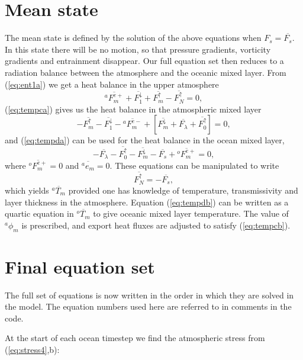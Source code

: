 \documentclass[11pt, a4paper,twoside]{article}
\newcommand{\e}[2]{{{}^{#1}e_{#2}}}
\newcommand{\T}[2]{{{}^{#1}T_{#2}}}
\newcommand{\F}[3]{{{}^{#1}F^{#3}_{#2}}}
\newcommand{\Fup}[1]{{F^{\uparrow}_{#1}}}
\newcommand{\Fdown}[1]{{F^{\downarrow}_{#1}}}
\newcommand{\lb}[2]{{{}^{#1}\phi_{#2}}}
\numberwithin{equation}{section}
\begin{document}
\section{Mean state}\label{sec:mean}
The mean state is defined by the solution of the above equations when $F_s = \overline{F_s}$.
In this state there will be no motion, so that pressure gradients, vorticity gradients and entrainment disappear.
Our full equation set then reduces to a radiation balance between the atmosphere and the oceanic mixed layer.
From (\ref{eq:ent1a}) we get a heat balance in the upper atmosphere
\begin{equation}\label{eq:ent1b}
\overline{\F{a}{m}{e+}} + \overline{\Fdown{1}} + \overline{\Fup{m}} - \overline{\Fup{N}}=0,
\end{equation}
(\ref{eq:tempca}) gives us the heat balance in the atmospheric mixed layer
\begin{equation}\label{eq:tempcb}
-  \overline{\Fup{m}} - \overline{\Fdown{1}} - \overline{\F{a}{m}{e-}} + [ \overline{\Fdown{m}} + \overline{F_{\lambda}} + \overline{\Fup{0}}]=0,
\end{equation}
and (\ref{eq:tempda}) can be used for the heat balance in the ocean mixed layer,
\begin{equation}\label{eq:tempdb}
- \overline{F_{\lambda}} - \overline{\Fup{0}} - \overline{\Fdown{m}} - \overline{F_s} +  \overline{\F{o}{m}{e+}}= 0,
\end{equation}
where $\overline{\F{o}{m}{e+}}=0$ and $\overline{\e{a}{m}} = 0$.
These equations can be manipulated to write
\begin{equation}\overline{\Fup{N}} =  - \overline{F_s},\end{equation}
which yields $\overline{\T{a}{m}}$ provided one has knowledge of temperature, transmissivity and layer thickness in the atmosphere.
Equation (\ref{eq:tempdb}) can be written as a quartic equation in $\overline{\T{o}{m}}$ to give oceanic mixed layer temperature.
The value of $\lb{a}{m}$ is prescribed, and export heat fluxes are adjusted to satisfy (\ref{eq:tempcb}).

\section{Final equation set}
The full set of equations is now written in the order in which they are solved in the model.
The equation numbers used here are referred to in comments in the code.


At the start of each ocean timestep we find the atmospheric stress from (\ref{eq:stress4},b):
\end{document}
